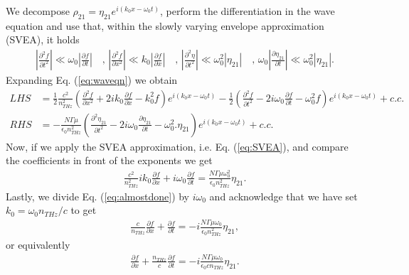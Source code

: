 \documentclass[preprint,secnumarabic,amssymb, nobibnotes, aip, prd]{revtex4-1}
\def\p{\partial}
\begin{document}
We decompose $\rho_{21}=\eta_{21}e^{i(k_0x-\omega_0t)}$, perform the differentiation in the wave equation and use that, within the slowly varying envelope approximation (SVEA), it holds
\begin{align}
\label{eq:SVEA}
\left |\frac{\p^2 f}{\p t^2}\right | \ll \omega_0\left|\frac{\p f}{\p t}\right| \quad \text{, } \left |\frac{\p^2 f}{\p x^2}\right | \ll k_0\left|\frac{\p f}{\p x}\right| \quad \text{, } \left |\frac{\p^2 \eta}{\p t^2}\right | \ll \omega_0^2 \left| \eta_{21}\right| \quad \text{, } \omega_0 \left| \frac{\p \eta_{21}}{\p t}\right| \ll  \omega_0^2\left|\eta_{21}\right|.
\end{align}
Expanding Eq. (\ref{eq:waveqn}) we obtain
\begin{align}
LHS &= \frac{1}{2} \frac{c^2}{n_{THz}^2} \left(\frac{\p^2 f}{\p x^2} +2ik_0 \frac{\p f}{\p x} -k_0^2 f\right)e^{i(k_0x-\omega_0t)} - \frac{1}{2}\left(\frac{\p^2 f}{\p t^2} -2i\omega_0 \frac{\p f}{\p t} -\omega_0^2 f\right)e^{i(k_0x-\omega_0t)} + c.c. \nonumber \\
RHS &= -\frac{N\Gamma\mu}{\epsilon_0 n_{THz}^2} \left(\frac{\p^2 \eta_{21}}{\p t^2} -2i\omega_0 \frac{\p \eta_{21}}{\p t} -\omega_0^2. \eta_{21}\right)e^{i(k_0x-\omega_0t)}+c.c.
\end{align}
Now, if we apply the SVEA approximation, i.e. Eq. (\ref{eq:SVEA}), and compare the coefficients in front of the exponents we get
\begin{align}
\label{eq:almostdone}
\frac{c^2}{n_{THz}^2}ik_0 \frac{\p f}{\p x}+i\omega_0 \frac{\p f}{\p t} = \frac{N\Gamma\mu\omega_0^2}{\epsilon_0 n_{THz}^2}\eta_{21}.
\end{align}
Lastly, we divide Eq. (\ref{eq:almostdone}) by $i\omega_0$ and acknowledge that we have set $k_0 = \omega_0 n_{THz}/c$ to get
\begin{align}
\label{eq:almostdone2}
\frac{c}{n_{THz}} \frac{\p f}{\p x}+ \frac{\p f}{\p t} = -i\frac{N\Gamma\mu\omega_0}{\epsilon_0 n_{THz}^2}\eta_{21},
\end{align}
or equivalently
\begin{align}
\label{eq:almostdone3}
\frac{\p f}{\p x}+ \frac{n_{THz}}{c} \frac{\p f}{\p t} = -i\frac{N\Gamma\mu\omega_0}{\epsilon_0 c n_{THz}}\eta_{21}.
\end{align}





\end{document}
